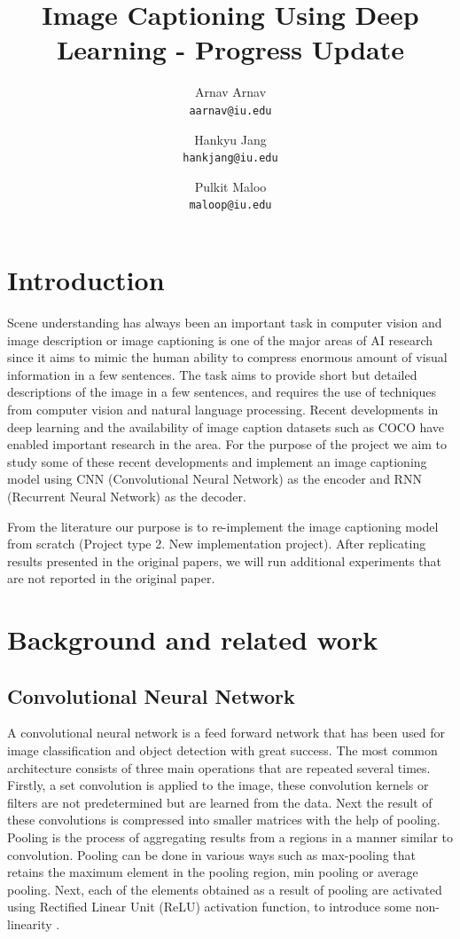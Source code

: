 \documentclass[a4paper]{article}
\title{Image Captioning Using Deep Learning - Progress Update}
\author{
Arnav Arnav\\
\texttt{aarnav@iu.edu}
\and 
Hankyu Jang\\
\texttt{hankjang@iu.edu}
\and 
Pulkit Maloo\\
\texttt{maloop@iu.edu}
}
\begin{document}
\maketitle


\section{Introduction}

Scene understanding has always been an important task in computer vision and image description or image captioning is one of the major areas of AI research since it aims to mimic the human ability to compress enormous amount of visual information in a few sentences. The task aims to provide short but detailed descriptions of the image in a few sentences, and requires the use of techniques from computer vision and natural language processing. Recent developments in deep learning and the availability of image caption datasets such as COCO have enabled important research in the area. For the purpose of the project we aim to study some of these recent developments and implement an image captioning model using CNN (Convolutional Neural Network) as the encoder and RNN (Recurrent Neural Network) as the decoder.

From the literature our purpose is to re-implement the image captioning model from scratch (Project type 2. New implementation project). After replicating results presented in the original papers, we will run additional experiments that are not reported in the original paper.

\section{Background and related work}

\subsection{Convolutional Neural Network}
A convolutional neural network is a feed forward network that  has been used for image classification and object detection with great success. The most common architecture consists of three main operations that are repeated several times. Firstly, a set convolution is applied to the image, these convolution kernels or filters are not predetermined but are learned from the data. Next the result of these convolutions is compressed into smaller matrices with the help of pooling.  Pooling is the process of aggregating results from a regions in a manner similar to convolution.  Pooling can be done in various ways such as max-pooling that retains the maximum element in the pooling region, min pooling or average pooling. Next, each of the elements obtained as a result of pooling are activated using Rectified Linear Unit (ReLU) activation function, to introduce some non-linearity \cite{wiki-cnn}.
\end{document}
